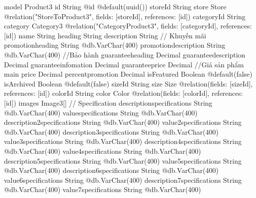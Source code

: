 model Product3 {
  id                           String                         @id @default(uuid())
  storeId                      String
  store                        Store                          @relation("StoreToProduct3", fields: [storeId], references: [id])
  categoryId                   String
  category                     Category3                      @relation("CategoryProduct3", fields: [categoryId], references: [id])
  name                         String
  heading                      String
  description                  String
  // Khuyến mãi
  promotionheading             String                         @db.VarChar(400)
  promotiondescription         String                         @db.VarChar(400)
  //Bảo hành
  guaranteeheading             Decimal
  guaranteedescription         Decimal
  guaranteeinfomation          Decimal
  guaranteeprice               Decimal
  //Giá sản phẩm main
  price                        Decimal
  percentpromotion             Decimal
  isFeatured                   Boolean                        @default(false)
  isArchived                   Boolean                        @default(false)
  sizeId                       String
  size                         Size                           @relation(fields: [sizeId], references: [id])
  colorId                      String
  color                        Color                          @relation(fields: [colorId], references: [id])
  images                       Image3[]
  // Specification
  descriptionspecifications    String                         @db.VarChar(400)
  valuespecifications          String                         @db.VarChar(400)
  description2specifications   String                         @db.VarChar(400)
  value2specifications         String                         @db.VarChar(400)
  description3specifications   String                         @db.VarChar(400)
  value3specifications         String                         @db.VarChar(400)
  description4specifications   String                         @db.VarChar(400)
  value4specifications         String                         @db.VarChar(400)
  description5specifications   String                         @db.VarChar(400)
  value5specifications         String                         @db.VarChar(400)
  description6specifications   String                         @db.VarChar(400)
  value6specifications         String                         @db.VarChar(400)
  description7specifications   String                         @db.VarChar(400)
  value7specifications         String                         @db.VarChar(400)
}
